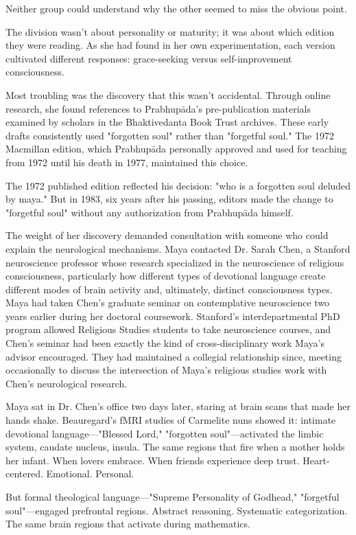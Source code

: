 \documentclass[12pt,twoside]{book}
\begin{document}
Neither group could understand why the other seemed to miss the obvious point.

The division wasn't about personality or maturity; it was about which edition they were reading. As she had found in her own experimentation, each version cultivated different responses: grace-seeking versus self-improvement consciousness.

Most troubling was the discovery that this wasn't accidental. Through online research, she found references to Prabhupāda's pre-publication materials examined by scholars in the Bhaktivedanta Book Trust archives. These early drafts consistently used "forgotten soul" rather than "forgetful soul." The 1972 Macmillan edition, which Prabhupāda personally approved and used for teaching from 1972 until his death in 1977, maintained this choice.

The 1972 published edition reflected his decision: "who is a forgotten soul deluded by maya." But in 1983, six years after his passing, editors made the change to "forgetful soul" without any authorization from Prabhupāda himself.

The weight of her discovery demanded consultation with someone who could explain the neurological mechanisms. Maya contacted Dr. Sarah Chen, a Stanford neuroscience professor whose research specialized in the neuroscience of religious consciousness, particularly how different types of devotional language create different modes of brain activity and, ultimately, distinct consciousness types. Maya had taken Chen's graduate seminar on contemplative neuroscience two years earlier during her doctoral coursework. Stanford's interdepartmental PhD program allowed Religious Studies students to take neuroscience courses, and Chen's seminar had been exactly the kind of cross-disciplinary work Maya's advisor encouraged. They had maintained a collegial relationship since, meeting occasionally to discuss the intersection of Maya's religious studies work with Chen's neurological research.

Maya sat in Dr. Chen's office two days later, staring at brain scans that made her hands shake. Beauregard's fMRI studies of Carmelite nuns showed it: intimate devotional language—"Blessed Lord," "forgotten soul"—activated the limbic system, caudate nucleus, insula. The same regions that fire when a mother holds her infant. When lovers embrace. When friends experience deep trust. Heart-centered. Emotional. Personal.

But formal theological language—"Supreme Personality of Godhead," "forgetful soul"—engaged prefrontal regions. Abstract reasoning. Systematic categorization. The same brain regions that activate during mathematics.
\end{document}
